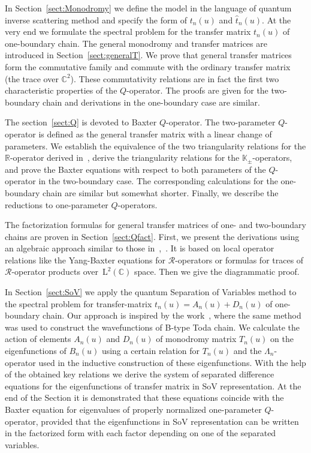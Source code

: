 \documentclass[a4paper,11pt]{article}
\numberwithin{equation}{section}
\begin{document}
In Section~\ref{sect:Monodromy} we define the model in the language of quantum inverse scattering method and specify the form of $t_n(u)$ and $\hat{t}_n(u)$. At the very end we formulate the spectral problem for the transfer matrix $t_n(u)$ of one-boundary chain.
The general monodromy and transfer matrices are introduced in Section~\ref{sect:generalT}.
We prove that general transfer matrices form the commutative family and commute with the ordinary transfer matrix (the trace over $\mathbb{C}^2$).
These commutativity relations are in fact the first two characteristic properties of the $Q$-operator.
The proofs are given for the two-boundary chain and derivations in the one-boundary case are similar.

The section~\ref{sect:Q} is devoted to Baxter $Q$-operator. The two-parameter $Q$-operator is defined as the general transfer matrix with a linear change of parameters.
We establish the equivalence of the two triangularity relations for the $\mathbb{R}$-operator derived in~\cite{Derkachov:2005fg}, derive the triangularity relations for the $\mathbb{K}_\pm$-operators, and prove the Baxter equations with respect to both parameters of the $Q$-operator in the two-boundary case. The corresponding calculations for the one-boundary chain are similar but somewhat shorter.
Finally, we describe the reductions to one-parameter $Q$-operators.

The factorization formulas for general transfer matrices of one- and two-boundary chains are proven in Section~\ref{sect:Qfact}.
First, we present the derivations using an algebraic approach similar to those in~\cite{ADV1},~\cite{ADV2}. It is based on local operator relations like the Yang-Baxter equations for $\mathcal{R}$-operators or formulas for traces of $\mathcal{R}$-operator products over~$\mathrm{L}^2(\mathbb{C})$ space.
Then we give the diagrammatic proof.

In Section~\ref{sect:SoV} we apply the quantum Separation of Variables method to the spectral problem for transfer-matrix $t_n(u)=A_n(u)+D_n(u)$ of one-boundary chain.
Our approach is inspired by the work~\cite{IS}, where the same method was used to construct the wavefunctions of B-type Toda chain.
We calculate the action of elements $A_n(u)$ and $D_n(u)$ of monodromy matrix $T_n(u)$ on the eigenfunctions of $B_n(u)$ using a certain relation for $T_n(u)$ and the $\Lambda_n$-operator used in the inductive construction of these eigenfunctions.
With the help of the obtained key relations we derive the system of separated difference equations for the eigenfunctions of transfer matrix in SoV representation.
At the end of the Section it is demonstrated that these equations coincide with the Baxter equation for eigenvalues of properly normalized one-parameter $Q$-operator, provided that the eigenfunctions in SoV representation can be written in the factorized form with each factor depending on one of the separated variables.
\end{document}
